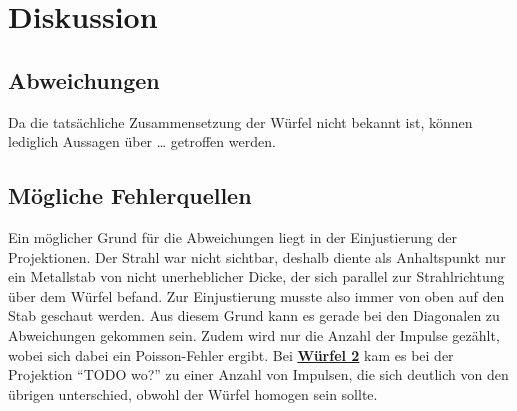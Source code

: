 \section{Diskussion}
\label{sec:diskussion}

\subsection{Abweichungen}
    Da die tatsächliche Zusammensetzung der Würfel nicht bekannt ist,
    können lediglich Aussagen über … getroffen werden.


\subsection{Mögliche Fehlerquellen}

    Ein möglicher Grund für die Abweichungen liegt in der Einjustierung der Projektionen.
    Der Strahl war nicht sichtbar,
    deshalb diente als Anhaltspunkt nur ein Metallstab von nicht unerheblicher Dicke,
    der sich parallel zur Strahlrichtung über dem Würfel befand.
    Zur Einjustierung musste also immer von oben auf den Stab geschaut werden.
    Aus diesem Grund kann es gerade bei den Diagonalen zu Abweichungen gekommen sein.
    Zudem wird nur die Anzahl der Impulse gezählt,
    wobei sich dabei ein Poisson-Fehler ergibt.
    Bei \hyperref[sec:auswertung:wuerfel2]{\textbf{Würfel 2}} kam es bei der Projektion \enquote{TODO wo?} zu einer Anzahl von Impulsen,
    die sich deutlich von den übrigen unterschied,
    obwohl der Würfel homogen sein sollte.

